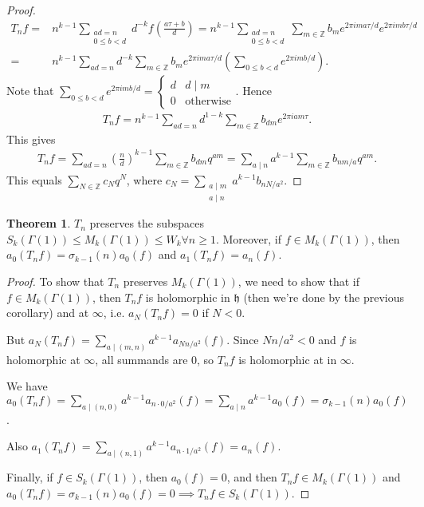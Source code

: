 \documentclass{article}
\theoremstyle{definition}
\newtheorem{theorem}{Theorem}[section]
\begin{document}
\begin{proof}
    \begin{align*}
        T_n f =& n^{k-1} \sum_{\substack{ad = n \\ 0\le b<d}}^{} d^{-k} f(\frac{a \tau + b}{d}) = n^{k-1} \sum_{\substack{ad = n\\ 0\le b<d}}^{} \sum_{ m \in \mathbb{Z}}^{} b_m e^{2 \pi i m a \tau/d}e^{2\pi i m b \tau/d} \\
        =& n^{k-1}\sum_{ad = n}^{} d^{-k}\sum_{ m \in \mathbb{Z}}^{} b_m e^{2\pi i m a \tau/d} \left(\sum_{0\le b<d}^{} e^{2\pi i m b /d}\right).
    \end{align*}
    Note that $\sum_{0\le b<d}^{} e^{2\pi i m b /d} = \begin{cases}
        d & d \mid m\\
        0 & \text{otherwise}
    \end{cases}$. Hence 
    \begin{align*}
        T_n f = n^{k-1}\sum_{ad=n}^{} d^{1-k}\sum_{m \in \mathbb{Z}}^{} b_{dm}e^{2\pi i a m \tau}.
    \end{align*}
    This gives 
    \begin{align*}
        T_n f = \sum_{ad = n}^{} \left(\frac{n}{d}\right)^{k-1}\sum_{ m \in \mathbb{Z}}^{} b_{dm}q^{am} = \sum_{a \mid n}^{} a^{k-1}\sum_{ m \in \mathbb{Z}}^{} b_{nm/a}q^{am}.
    \end{align*}
    This equals $\sum_{N \in \mathbb{Z}}^{} c_N q^N$, where $c_N = \sum_{\substack{a \mid m \\ a \mid n}}^{} a^{k-1}b_{nN/a^2}$.
\end{proof}
\begin{theorem}
    $T_n$ preserves the subspaces $S_k(\Gamma(1)) \le M_k(\Gamma(1)) \le W_k \forall n\ge 1$. Moreover, if $f \in M_k(\Gamma(1))$, then $a_0(T_n f) = \sigma_{k-1}(n) a_0(f)$ and $a_1(T_n f) = a_n (f)$. 
\end{theorem}
\begin{proof}
    To show that $T_n$ preserves $M_k(\Gamma(1))$, we need to show that if $f \in M_k(\Gamma(1))$, then $T_n f$ is holomorphic in $\mathfrak{h}$ (then we're done by the previous corollary) and at $\infty$, i.e. $a_N(T_n f) = 0$ if $N<0$.
    \vspace{1mm}
     
    But $a_N(T_n f)= \sum_{a \mid (m,n)}^{} a^{k-1}a_{Nn/a^2}(f)$. Since $Nn/a^2<0$ and $f$ is holomorphic at $\infty$, all summands are 0, so $T_n f$ is holomorphic at in $\infty$.
    \vspace{1mm}
     
    We have $a_0(T_n f) = \sum_{a \mid (n,0)}^{} a^{k-1}a_{n\cdot 0/a^2}(f) = \sum_{a \mid n}^{} a^{k-1}a_0(f) = \sigma_{k-1}(n)a_0(f)$.
    \vspace{1mm}
     
    Also $a_1(T_n f) = \sum_{a \mid (n,1)}^{} a^{k-1}a_{n\cdot 1/a^2}(f) = a_n(f)$.
    \vspace{1mm}
     
    Finally, if $f \in S_k(\Gamma(1))$, then $a_0(f) = 0$, and then $T_n f \in M_k(\Gamma(1))$ and $a_0(T_n f) = \sigma_{k-1}(n)a_0(f) = 0 \implies T_n f \in S_k(\Gamma(1))$. 
\end{proof}
\end{document}
